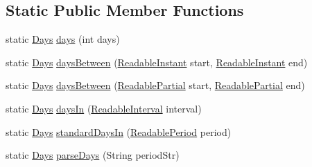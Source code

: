 \subsection*{Static Public Member Functions}
\begin{DoxyCompactItemize}
\item 
static \hyperlink{classorg_1_1joda_1_1time_1_1_days}{Days} \hyperlink{classorg_1_1joda_1_1time_1_1_days_a1e3870b240bd5cb9461d87e8c753eb60}{days} (int days)
\item 
static \hyperlink{classorg_1_1joda_1_1time_1_1_days}{Days} \hyperlink{classorg_1_1joda_1_1time_1_1_days_ac99aed5208effcb15aeb3279862c1551}{days\-Between} (\hyperlink{interfaceorg_1_1joda_1_1time_1_1_readable_instant}{Readable\-Instant} start, \hyperlink{interfaceorg_1_1joda_1_1time_1_1_readable_instant}{Readable\-Instant} end)
\item 
static \hyperlink{classorg_1_1joda_1_1time_1_1_days}{Days} \hyperlink{classorg_1_1joda_1_1time_1_1_days_a350ed2cd8d31ae4a42775ee702262a23}{days\-Between} (\hyperlink{interfaceorg_1_1joda_1_1time_1_1_readable_partial}{Readable\-Partial} start, \hyperlink{interfaceorg_1_1joda_1_1time_1_1_readable_partial}{Readable\-Partial} end)
\item 
static \hyperlink{classorg_1_1joda_1_1time_1_1_days}{Days} \hyperlink{classorg_1_1joda_1_1time_1_1_days_aa4a1ed4219144c95d53d7d29fe2e4f12}{days\-In} (\hyperlink{interfaceorg_1_1joda_1_1time_1_1_readable_interval}{Readable\-Interval} interval)
\item 
static \hyperlink{classorg_1_1joda_1_1time_1_1_days}{Days} \hyperlink{classorg_1_1joda_1_1time_1_1_days_a4d0cb4462bc724c8f04dbd445b2035aa}{standard\-Days\-In} (\hyperlink{interfaceorg_1_1joda_1_1time_1_1_readable_period}{Readable\-Period} period)
\item 
static \hyperlink{classorg_1_1joda_1_1time_1_1_days}{Days} \hyperlink{classorg_1_1joda_1_1time_1_1_days_a1d414773454cfafd7b5a47b68fdb96f7}{parse\-Days} (String period\-Str)
\end{DoxyCompactItemize}
